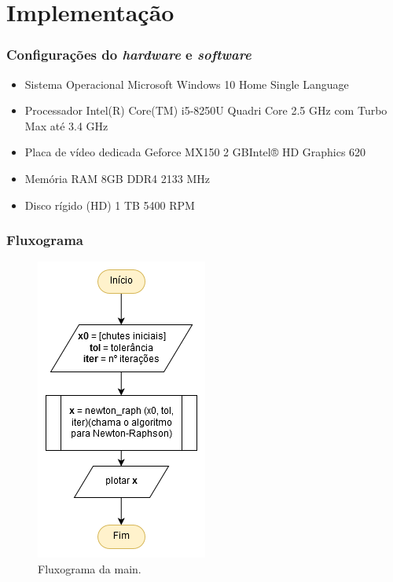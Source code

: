 \documentclass[aspectratio=1610]{beamer}
\begin{document}
\section{Implementação}
\begin{frame}
\frametitle{Configurações do \textit{hardware} e \textit{software}}

\begin{itemize}
 \item Sistema Operacional Microsoft Windows 10 Home Single Language 
 
 \item Processador Intel(R) Core(TM) i5-8250U Quadri Core 2.5 GHz com Turbo Max até 3.4 GHz 
 
 \item Placa de vídeo dedicada Geforce MX150 2 GBIntel® HD Graphics 620 
 
 \item Memória RAM 8GB DDR4 2133 MHz
 
 \item Disco rígido (HD) 1 TB 5400 RPM
\end{itemize}

\end{frame}


\begin{frame}
\frametitle{Fluxograma}


\begin{figure}
  \centering
  \includegraphics[scale=0.55]{Imagens/diag_main.png}
  \caption{Fluxograma da main.}
\end{figure}


\end{frame}
\end{document}
